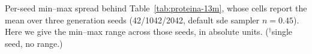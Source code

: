 \begin{table}[tbp]
\centering
\scriptsize
\setlength{\tabcolsep}{4pt}
\resizebox{\textwidth}{!}{%
}
\caption{Per-seed min--max spread behind Table~\ref{tab:proteina-13m}, whose cells report the mean over three generation seeds (42/1042/2042, default sde sampler $n{=}0.45$). Here we give the min--max range across those seeds, in absolute units. ($^{\dagger}$single seed, no range.)}
\label{tab:proteina-13m-ranges}
\end{table}
